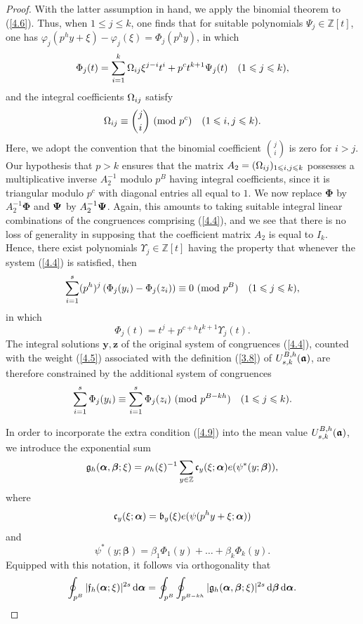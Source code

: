 \documentclass[12pt,reqno]{amsart}
\theoremstyle{definition}
\theoremstyle{remark}
\numberwithin{equation}{section}
\newcommand{\mmod}[1]{\,\,(\text{\rm mod}\,\,#1)}
\def\bfy{{\mathbf y}}
\def\bfz{{\mathbf z}}
\def\dbZ{{\mathbb Z}}\def\dbQ{{\mathbb Q}}
\def\grb{{\mathfrak b}}\def\grB{{\mathfrak B}}\def\bfgrb{{\boldsymbol \grb}}
\def\grc{{\mathfrak c}}\def\grC{{\mathfrak C}}\def\bfgrc{{\boldsymbol \grc}}
\def\grf{{\mathfrak f}}\def\grF{{\mathfrak F}}
\def\grg{{\mathfrak g}}\def\grG{{\mathfrak G}}
\def\bet{{\beta}}  \def\bfbet{{\boldsymbol \beta}}
\def\Ups{{\Upsilon}} \def\Upshat{{\widehat \Ups}}\def\bfUps{{\boldsymbol \Ups}}
\def\bfPhi{{\boldsymbol \Phi}} \def\bfvarphi{{\boldsymbol \varphi}}
\def\le{\leqslant} \def\ge{\geqslant} \def\pleq{\preccurlyeq} \def\ple{\prec}
\def\d{{\,{\rm d}}}
\begin{document}
\begin{proof}
\par With the latter assumption in hand, we apply the binomial theorem to (\ref{4.6}). Thus, 
when $1\le j\le k$, one finds that for suitable polynomials $\Psi_j\in \dbZ[t]$, one 
has $\varphi_j(p^hy+\xi)-\varphi_j(\xi)=\Phi_j(p^hy)$, in which
$$\Phi_j(t)=\sum_{i=1}^k\Ome_{ij}\xi^{j-i}t^i+p^ct^{k+1}\Psi_j(t)\quad (1\le j\le k),$$
and the integral coefficients ${\Omega}_{ij}$ satisfy
$$\Ome_{ij}\equiv \binom{j}{i}\mmod{p^c}\quad (1\le i,j\le k).$$
Here, we adopt the convention that the binomial coefficient $\binom{j}{i}$ is zero for 
$i>j$. Our hypothesis that $p>k$ ensures that the matrix 
$A_2=(\Ome_{ij})_{1\le i,j\le k}$ possesses a multiplicative inverse $A_2^{-1}$ modulo 
$p^B$ having integral coefficients, since it is triangular modulo $p^c$ with diagonal 
entries all equal to $1$. We now replace $\bfPhi$ by $A_2^{-1}\bfPhi$ and ${\boldsymbol \Psi}$ by 
$A_2^{-1}{\boldsymbol \Psi}$. Again, this amounts to taking suitable integral linear combinations of the 
congruences comprising (\ref{4.4}), and we see that there is no loss of generality in 
supposing that the coefficient matrix $A_2$ is equal to $I_k$. Hence, there exist polynomials 
$\Ups_j\in \dbZ[t]$ having the property that whenever the system (\ref{4.4}) is satisfied, 
then
\begin{equation}\label{4.7}
\sum_{i=1}^s(p^h)^j\left( \Phi_j(y_i)-\Phi_j(z_i)\right) \equiv 0\mmod{p^B}\quad 
(1\le j\le k),
\end{equation}
in which
\begin{equation}\label{4.8}
\Phi_j(t)=t^j+p^{c+h}t^{k+1}\Ups_j(t).
\end{equation}
The integral solutions $\bfy,\bfz$ of the original system of congruences (\ref{4.4}), 
counted with the weight (\ref{4.5}) associated with the definition (\ref{3.8}) of 
$U_{s,k}^{B,h}({\boldsymbol {{\mathfrak a}}})$, are therefore constrained by the additional system of 
congruences
\begin{equation}\label{4.9}
\sum_{i=1}^s\Phi_j(y_i)\equiv \sum_{i=1}^s\Phi_j(z_i)\mmod{p^{B-kh}}\quad 
(1\le j\le k).
\end{equation}

\par In order to incorporate the extra condition (\ref{4.9}) into the mean value 
$U_{s,k}^{B,h}({\boldsymbol {{\mathfrak a}}})$, we introduce the exponential sum
\begin{equation}\label{4.10}
\grg_h(\bfalp,\bfbet;\xi)=\rho_h(\xi)^{-1}\sum_{y\in \dbZ}\grc_y(\xi;\bfalp)
e(\psi^*(y;\bfbet)),
\end{equation}
where
\begin{equation}\label{4.11}
\grc_y(\xi;\bfalp)=\grb_y(\xi)e(\psi(p^hy+\xi;\bfalp))
\end{equation}
and
$$\psi^*(y;\bfbet)=\bet_1\Phi_1(y)+\ldots +\bet_k\Phi_k(y).$$
Equipped with this notation, it follows via orthogonality that
\begin{equation}\label{4.12}
\oint_{p^B}|\grf_h(\bfalp;\xi)|^{2s}\d\bfalp =\oint_{p^B}\oint_{p^{B-kh}}
|\grg_h(\bfalp,\bfbet;\xi)|^{2s}\d\bfbet \d\bfalp.
\end{equation}


\end{proof}
\end{document}

